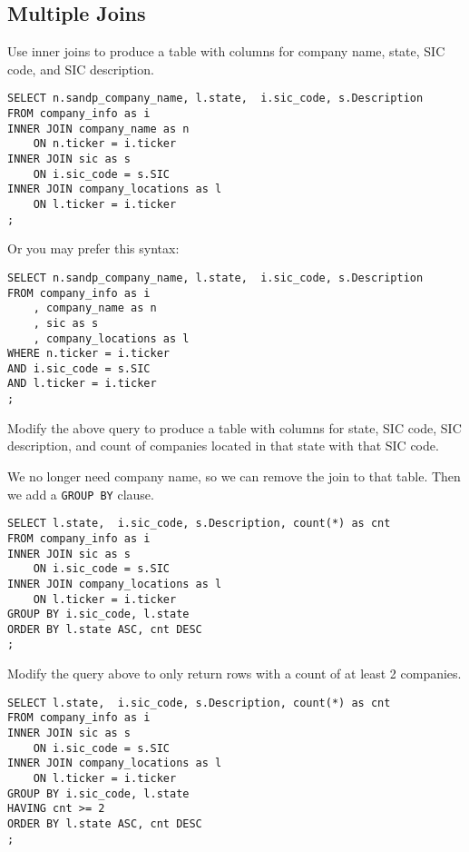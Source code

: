 \documentclass[10pt]{exam}
\begin{document}
\begin{questions}
\subsection*{Multiple Joins}

\question Use inner joins to produce a table with columns for company name,
state, SIC code, and SIC description.

\begin{solution}
\begin{lstlisting}
SELECT n.sandp_company_name, l.state,  i.sic_code, s.Description
FROM company_info as i
INNER JOIN company_name as n
    ON n.ticker = i.ticker
INNER JOIN sic as s
    ON i.sic_code = s.SIC
INNER JOIN company_locations as l
    ON l.ticker = i.ticker
;
\end{lstlisting}

Or you may prefer this syntax:

\begin{lstlisting}
SELECT n.sandp_company_name, l.state,  i.sic_code, s.Description
FROM company_info as i
    , company_name as n
    , sic as s 
    , company_locations as l 
WHERE n.ticker = i.ticker
AND i.sic_code = s.SIC
AND l.ticker = i.ticker
;
\end{lstlisting}
\end{solution}


\question Modify the above query to 
produce a table with columns for state, SIC
code, SIC description, and count of companies located in that state
with that SIC code.

\begin{solution}

    We no longer need company name, so we can remove the join to that
    table. Then we add a \texttt{GROUP BY} clause.

\begin{lstlisting}
SELECT l.state,  i.sic_code, s.Description, count(*) as cnt
FROM company_info as i
INNER JOIN sic as s
    ON i.sic_code = s.SIC
INNER JOIN company_locations as l
    ON l.ticker = i.ticker
GROUP BY i.sic_code, l.state
ORDER BY l.state ASC, cnt DESC
;
\end{lstlisting}
\end{solution}


\question Modify the query above to only return rows with a count
of at least 2 companies.

\begin{solution}
\begin{lstlisting}
SELECT l.state,  i.sic_code, s.Description, count(*) as cnt
FROM company_info as i
INNER JOIN sic as s
    ON i.sic_code = s.SIC
INNER JOIN company_locations as l
    ON l.ticker = i.ticker
GROUP BY i.sic_code, l.state
HAVING cnt >= 2
ORDER BY l.state ASC, cnt DESC
;
\end{lstlisting}
\end{solution}


\end{questions}
\end{document}
